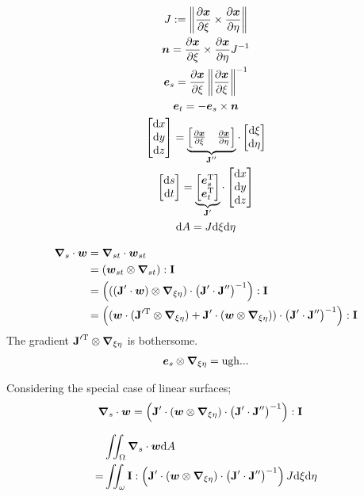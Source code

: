 \documentclass[a4paper,11pt]{article}
\renewcommand{\to}[1]{\text{\boldmath $#1$}} %
\newcommand{\ts}[1]{\text{\boldmath $\rm #1$}} %
\newcommand{\intd}[1]{{\rm d}#1}
\newcommand{\pderiv}[2]{\frac{\partial#1}{\partial#2}}
\newcommand{\norm}[1]{\left\lVert{#1}\right\rVert}
\newcommand{\T}{{\rm T}}
\newcommand{\defeq}{:=}
\begin{document}
\begin{gather}
 J \defeq \norm{\pderiv{\to x}{\xi} \times  \pderiv{\to x}{\eta}}\\
 \to n = \pderiv{\to x}{\xi} \times \pderiv{\to x}{\eta} J^{-1}\\
 \to e_s = \pderiv{\to x}{\xi}\norm{\pderiv{\to x}{\xi}}^{-1}\\
 \to e_t = -\to e_s\times \to n\\
 \begin{bmatrix}\intd x\\ \intd y\\ \intd z\end{bmatrix} =
  \underbrace{\begin{bmatrix}\pderiv{\to x}{\xi} & \pderiv{\to x}{\eta}
  \end{bmatrix}}_{\ts J''}
  \cdot \begin{bmatrix}\intd \xi \\ \intd \eta\end{bmatrix}\\
 \begin{bmatrix}\intd s\\ \intd t\end{bmatrix} =
  \underbrace{\begin{bmatrix} \to e_s^\T \\ \to e_t^\T
  \end{bmatrix}}_{\ts J'}
  \cdot \begin{bmatrix}\intd x \\ \intd y \\ \intd z\end{bmatrix}\\
 \intd A = J \intd \xi \intd \eta
\end{gather}

\begin{align}
 \to\nabla_s\cdot\to w &= \to\nabla_{st}\cdot\to w_{st} \\
 &= (\to w_{st}\otimes\to\nabla_{st}):\ts I \\
 &= \left(((\ts J'\cdot \to w) \otimes \to\nabla_{\xi\eta})\cdot \left(\ts J'\cdot\ts J''\right)^{-1}\right): \ts I\\
 &= \left((\to w\cdot (\ts J'^\T \otimes \to\nabla_{\xi\eta}) +\ts J'\cdot(\to w\otimes\to\nabla_{\xi\eta}) )\cdot \left(\ts J'\cdot\ts J''\right)^{-1}\right): \ts I
\end{align}
The gradient $\ts J'^\T \otimes\to\nabla_{\xi\eta}$ is bothersome.
\begin{align}
 \to e_s \otimes \to\nabla_{\xi\eta} = \text{ugh...}
\end{align}

Considering the special case of linear surfaces;
\begin{align}
  \to\nabla_s\cdot\to w &= \left(\ts J'\cdot(\to w\otimes\to\nabla_{\xi\eta})\cdot \left(\ts J'\cdot\ts J''\right)^{-1}\right): \ts I
\end{align}

\begin{align}
 &\iint_\Omega\to \nabla_s\cdot\to w\intd A\\
=&\iint_\omega \ts I:\left(\ts J'\cdot(\to w\otimes\to\nabla_{\xi\eta})\cdot \left(\ts J'\cdot\ts J''\right)^{-1}\right)J\intd\xi\intd\eta
\end{align}
\end{document}
